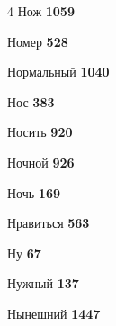\begin{multicols}{4}
\noindent Нож \dotfill \textbf{\color{secondary} 1059}\par
\noindent Номер \dotfill \textbf{\color{secondary} 528}\par
\noindent Нормальный \dotfill \textbf{\color{secondary} 1040}\par
\noindent Нос \dotfill \textbf{\color{secondary} 383}\par
\noindent Носить \dotfill \textbf{\color{secondary} 920}\par
\noindent Ночной \dotfill \textbf{\color{secondary} 926}\par
\noindent Ночь \dotfill \textbf{\color{secondary} 169}\par
\noindent Нравиться \dotfill \textbf{\color{secondary} 563}\par
\noindent Ну \dotfill \textbf{\color{secondary} 67}\par
\noindent Нужный \dotfill \textbf{\color{secondary} 137}\par
\noindent Нынешний \dotfill \textbf{\color{secondary} 1447}\par


\end{multicols}
